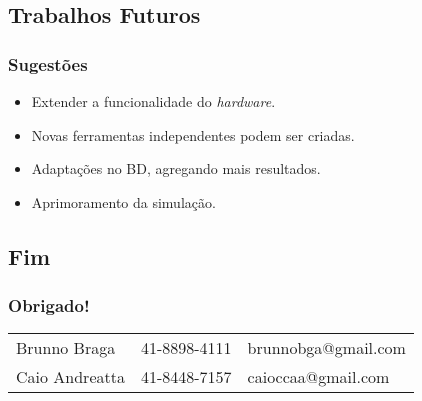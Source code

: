 \subsection{Trabalhos Futuros}
    \begin{frame}\frametitle{Sugestões}
	\begin{itemize}
		\item Extender a funcionalidade do \emph{hardware}.
		\item Novas ferramentas independentes podem ser criadas.
		\item Adaptações no BD, agregando mais resultados.
		\item Aprimoramento da simulação.
	\end{itemize}
    \end{frame}
    
\subsection{Fim}
    \begin{frame}\frametitle{Obrigado!}
        \begin{table}[!h]
	        \begin{tabular}{lll}
                Brunno Braga & 41-8898-4111 & brunnobga@gmail.com \\
                Caio Andreatta & 41-8448-7157 & caioccaa@gmail.com \\
	        \end{tabular}
        \end{table}
    \end{frame}
